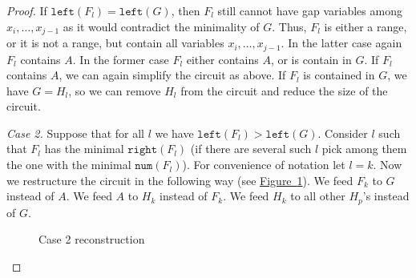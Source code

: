 \documentclass[11pt]{article}
\numberwithin{equation}{section}
\theoremstyle{definition}
\theoremstyle{plain}
\newcommand{\expref}[2]{\hyperref[#2]{#1~\ref{#2}}}
\theoremstyle{plain}\newtheorem{observation}[theorem]{Observation}
\newcommand{\lef}{\texttt{left}}
\newcommand{\righ}{\texttt{right}}
\newcommand{\num}{\texttt{num}}
\begin{document}
\begin{proof}[Proof]
    If $\lef(F_l) = \lef(G)$, then $F_l$ still cannot have gap variables among $x_i, \ldots, x_{j-1}$ as it would contradict the minimality of $G$. Thus, $F_l$ is either a range, or it is not a range, but contain all variables $x_i, \ldots, x_{j-1}$. In the latter case again $F_l$ contains $A$. In the former case $F_l$ either contains $A$, or is contain in $G$. If $F_l$ contains $A$, we can again simplify the circuit as above. If $F_l$ is contained in $G$, we have $G=H_l$, so we can remove $H_l$ from the circuit and reduce the size of the circuit.

    \emph{Case 2.} Suppose that for all $l$ we have $\lef(F_l)>\lef(G)$. Consider $l$ such that $F_l$ has the minimal $\righ(F_l)$ (if there are several such $l$ pick among them the one with the minimal $\num(F_l)$). For convenience of notation let $l=k$. Now we restructure the circuit in the following way (see \expref{Figure}{fig:after}). We feed $F_k$ to $G$ instead of $A$. We feed $A$ to $H_k$ instead of $F_k$. We feed $H_k$ to all other $H_p$'s instead of $G$.

    \begin{figure}[ht]
        \begin{center}
        \end{center}
        \caption{Case 2 reconstruction} \label{fig:after}
    \end{figure}


\end{proof}
\end{document}
